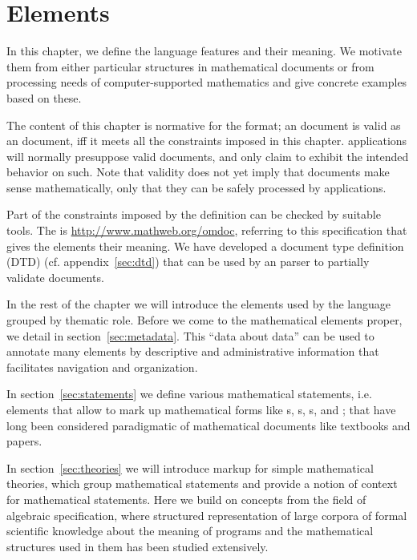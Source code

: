 \chapter{{\else{\omdoc}\fi} Elements}\label{chap:omdoc}

In this chapter, we define the {\omdoc} language features and their meaning. We
motivate them from either particular structures in mathematical documents or from
processing needs of computer-supported mathematics and give concrete examples
based on these.

The content of this chapter is normative for the {\omdoc} format; an
{\omdoc} document is valid as an {\omdoc} document, iff it meets all
the constraints imposed in this chapter. {\omdoc} applications will
normally presuppose valid {\omdoc} documents, and only claim to
exhibit the intended behavior on such.  Note that {\omdoc} validity
does not yet imply that documents make sense mathematically, only that
they can be safely processed by {\omdoc} applications.

Part of the constraints imposed by the {\omdoc} definition can be checked by
suitable {\xml} tools. The {} is
{\url{http://www.mathweb.org/omdoc}}, referring to this specification that gives
the {\omdoc} elements their meaning. We have developed a document type definition
(DTD) (cf.  appendix~\ref{sec:dtd}) that can be used by an {\xml} parser to
partially validate {\omdoc} documents.

In the rest of the chapter we will introduce the {\xml} elements used
by the {\omdoc} language grouped by thematic role. Before we come to
the mathematical elements proper, we detail {\omdoc}
{} in section~\ref{sec:metadata}.  This ``data
about data'' can be used to annotate many {\omdoc} elements by
descriptive and administrative information that facilitates navigation
and organization.

In section~\ref{sec:statements} we define various mathematical
statements, i.e.
elements that allow to mark up mathematical forms like {s},
{s}, {s}, and {}; that have long
been considered paradigmatic of mathematical documents like textbooks and papers.

In section~\ref{sec:theories} we will introduce markup for simple mathematical
theories, which group mathematical statements and provide a notion of context for
mathematical statements. Here we build on concepts from the field of algebraic
specification, where structured representation of large corpora of formal
scientific knowledge about the meaning of programs and the mathematical structures
used in them has been studied extensively.

